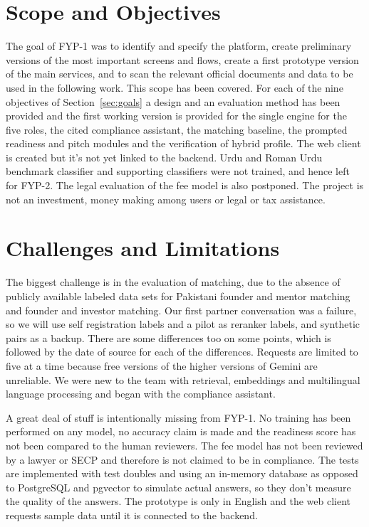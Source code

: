 \documentclass{FastFyp}
\begin{document}
\section{Scope and Objectives}
The goal of FYP-1 was to identify and specify the platform, create preliminary versions of the most important screens and flows, create a first prototype version of the main services, and to scan the relevant official documents and data to be used in the following work. This scope has been covered. For each of the nine objectives of Section~\ref{sec:goals} a design and an evaluation method has been provided and the first working version is provided for the single engine for the five roles, the cited compliance assistant, the matching baseline, the prompted readiness and pitch modules and the verification of hybrid profile. The web client is created but it's not yet linked to the backend. Urdu and Roman Urdu benchmark classifier and supporting classifiers were not trained, and hence left for FYP-2. The legal evaluation of the fee model is also postponed. The project is not an investment, money making among users or legal or tax assistance.

\section{Challenges and Limitations}
The biggest challenge is in the evaluation of matching, due to the absence of publicly available labeled data sets for Pakistani founder and mentor matching and founder and investor matching. Our first partner conversation was a failure, so we will use self registration labels and a pilot as reranker labels, and synthetic pairs as a backup. There are some differences too on some points, which is followed by the date of source for each of the differences. Requests are limited to five at a time because free versions of the higher versions of Gemini are unreliable. We were new to the team with retrieval, embeddings and multilingual language processing and began with the compliance assistant.

A great deal of stuff is intentionally missing from FYP-1. No training has been performed on any model, no accuracy claim is made and the readiness score has not been compared to the human reviewers. The fee model has not been reviewed by a lawyer or SECP and therefore is not claimed to be in compliance. The tests are implemented with test doubles and using an in-memory database as opposed to PostgreSQL and pgvector to simulate actual answers, so they don't measure the quality of the answers. The prototype is only in English and the web client requests sample data until it is connected to the backend.
\end{document}
